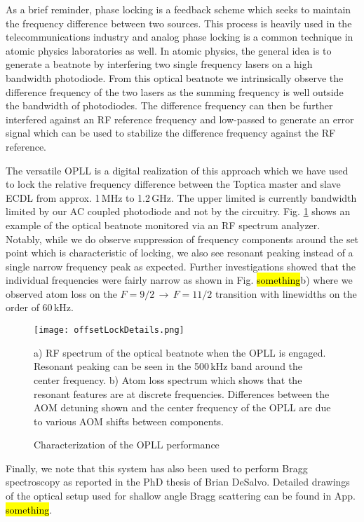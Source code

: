 As a brief reminder, phase locking is a feedback scheme which seeks to maintain the frequency difference between two sources.
This process is heavily used in the telecommunications industry and analog phase locking is a common technique in atomic physics laboratories as well.
In atomic physics, the general idea is to generate a beatnote by interfering two single frequency lasers on a high bandwidth photodiode.
From this optical beatnote we intrinsically observe the difference frequency of the two lasers as the summing frequency is well outside the bandwidth of photodiodes.
The difference frequency can then be further interfered against an RF reference frequency and low-passed to generate an error signal which can be used to stabilize the difference frequency against the RF reference.

The versatile OPLL is a digital realization of this approach which we have used to lock the relative frequency difference between the Toptica master and slave ECDL from approx. 1\,MHz to 1.2\,GHz.
The upper limited is currently bandwidth limited by our AC coupled photodiode and not by the circuitry.
Fig. \ref{fig:offsetDetails} shows an example of the optical beatnote monitored via an RF spectrum analyzer.
Notably, while we do observe suppression of frequency components around the set point which is characteristic of locking, we also see resonant peaking instead of a single narrow frequency peak as expected.
Further investigations showed that the individual frequencies were fairly narrow as shown in Fig. \hl{something}b) where we observed atom loss on the $F=9/2\,\rightarrow\,F=11/2$ transition with linewidths on the order of 60\,kHz.
	\begin{figure}
	\centerline{
		\texttt{[image: offsetLockDetails.png]}}
		\caption{Characterization of the OPLL performance}{a) RF spectrum of the optical beatnote when the OPLL is engaged. Resonant peaking can be seen in the 500\,kHz band around the center frequency. b) Atom loss spectrum which shows that the resonant features are at discrete frequencies. Differences between the AOM detuning shown and the center frequency of the OPLL are due to various AOM shifts between components.}
		 \label{fig:offsetDetails}
	\end{figure}

Finally, we note that this system has also been used to perform Bragg spectroscopy as reported in the PhD thesis of Brian DeSalvo.
Detailed drawings of the optical setup used for shallow angle Bragg scattering can be found in App. \hl{something}.



